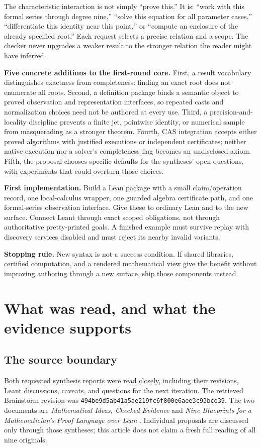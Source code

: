 \documentclass[11pt,letterpaper]{article}
\newcommand{\code}[1]{\nolinkurl{#1}}
\theoremstyle{definition}
\begin{document}
The characteristic interaction is not simply ``prove this.'' It is: ``work with
this formal series through degree nine,'' ``solve this equation for all parameter
cases,'' ``differentiate this identity near this point,'' or ``compute an enclosure
of the already specified root.'' Each request selects a precise relation and a
scope. The checker never upgrades a weaker result to the stronger relation the
reader might have inferred.

\textbf{Five concrete additions to the first-round core.}
First, a result vocabulary distinguishes exactness from completeness: finding an
exact root does not enumerate all roots. Second, a definition package binds a
semantic object to proved observation and representation interfaces, so repeated
casts and normalization choices need not be authored at every use. Third, a
precision-and-locality discipline prevents a finite jet, pointwise identity, or
numerical sample from masquerading as a stronger theorem. Fourth, CAS integration
accepts either proved algorithms with justified executions or independent
certificates; neither native execution nor a solver's completeness flag becomes
an undisclosed axiom. Fifth, the proposal chooses specific defaults for the
syntheses' open questions, with experiments that could overturn those choices.

\textbf{First implementation.} Build a Lean package with a small claim/operation
record, one local-calculus wrapper, one guarded algebra certificate path, and one
formal-series observation interface. Give these to ordinary Lean and to the new
surface. Connect Leant through exact scoped obligations, not through authoritative
pretty-printed goals. A finished example must survive replay with discovery
services disabled and must reject its nearby invalid variants.

\textbf{Stopping rule.} New syntax is not a success condition. If shared libraries,
certified computation, and a rendered mathematical view give the benefit without
improving authoring through a new surface, ship those components instead.

\endgroup
\clearpage
\begingroup
\small\setlength{\parskip}{0pt}
\tableofcontents
\endgroup
\clearpage

\section{What was read, and what the evidence supports}\label{sec:evidence}
\subsection{The source boundary}
Both requested synthesis reports were read closely, including their revisions,
Leant discussions, caveats, and questions for the next iteration. The retrieved
Brainstorm revision was \code{494be9d5ab41a5ae219fc6f800e6aee3c93bce39}.
The two documents are \emph{Mathematical Ideas, Checked Evidence} and
\emph{Nine Blueprints for a Mathematician's Proof Language over Lean}
\cite{synthesis,review}. Individual proposals are discussed only through those
syntheses; this article does not claim a fresh full reading of all nine originals.
\end{document}
